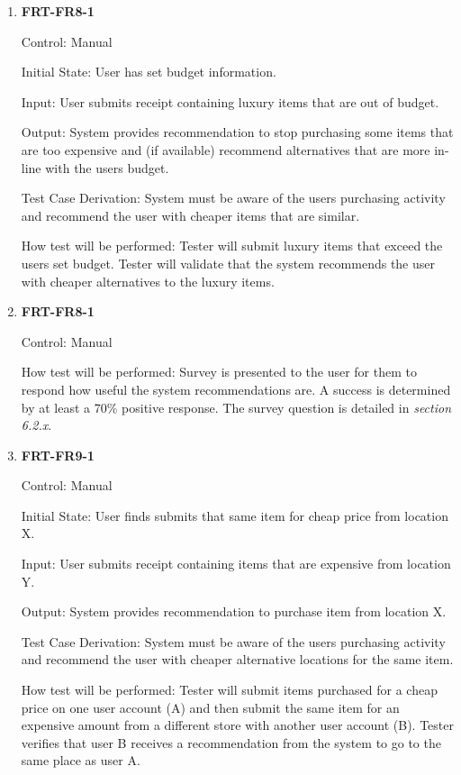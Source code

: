 \documentclass[12pt, titlepage]{article}
\begin{document}
\begin{enumerate}

\item{\textbf{FRT-FR8-1}}

Control: Manual
          
Initial State: User has set budget information.

Input: User submits receipt containing luxury items that are out of budget.
          
Output: System provides recommendation to stop purchasing some items that are too expensive and (if available) recommend alternatives that are more in-line with the users budget.

Test Case Derivation: System must be aware of the users purchasing activity and recommend the user with cheaper items that are similar.
          
How test will be performed: Tester will submit luxury items that exceed the users set budget. Tester will validate that the system recommends the user with cheaper alternatives to the luxury items.

\item{\textbf{FRT-FR8-1}}

Control: Manual

How test will be performed: Survey is presented to the user for them to respond how useful the system recommendations are. A success is determined by at least a 70\% positive response. The survey question is detailed in \textit{section 6.2.x}. %


\item{\textbf{FRT-FR9-1}}

Control: Manual
          
Initial State: User finds submits that same item for cheap price from location X.

Input: User submits receipt containing items that are expensive from location Y.
          
Output: System provides recommendation to purchase item from location X.

Test Case Derivation: System must be aware of the users purchasing activity and recommend the user with cheaper alternative locations for the same item.
          
How test will be performed: Tester will submit items purchased for a cheap price on one user account (A) and then submit the same item for an expensive amount from a different store with another user account (B). Tester verifies that user B receives a recommendation from the system to go to the same place as user A.


\end{enumerate}
\end{document}
